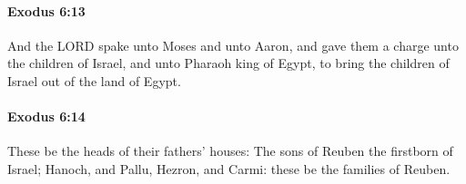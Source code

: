 		\paragraph{Exodus 6:13} %
			\label{EXODUS-6-13}

			And the LORD spake unto Moses and unto Aaron, and gave them a charge unto the children of Israel, and unto Pharaoh king of Egypt, to bring the children of Israel out of the land of Egypt.


		\paragraph{Exodus 6:14} %
			\label{EXODUS-6-14}

			These be the heads of their fathers' houses: The sons of Reuben the firstborn of Israel; Hanoch, and Pallu, Hezron, and Carmi: these be the families of Reuben.


